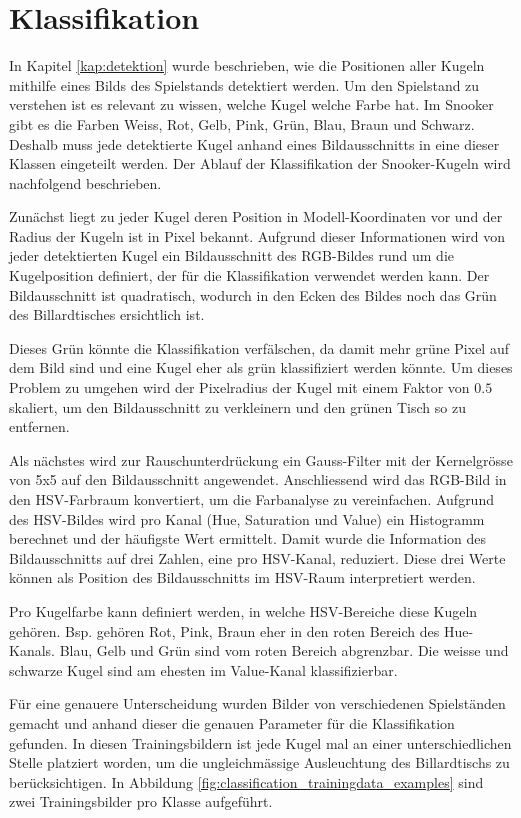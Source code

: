 \newpage
\section{Klassifikation}\label{kap:klassifikation}
In Kapitel \ref{kap:detektion} wurde beschrieben, wie die Positionen aller Kugeln mithilfe eines Bilds des Spielstands detektiert werden.
Um den Spielstand zu verstehen ist es relevant zu wissen, welche Kugel welche Farbe hat.
Im Snooker gibt es die Farben Weiss, Rot, Gelb, Pink, Grün, Blau, Braun und Schwarz.
Deshalb muss jede detektierte Kugel anhand eines Bildausschnitts in eine dieser Klassen eingeteilt werden.
Der Ablauf der Klassifikation der Snooker-Kugeln wird nachfolgend beschrieben.

Zunächst liegt zu jeder Kugel deren Position in Modell-Koordinaten vor und der Radius der Kugeln ist in Pixel bekannt\cite{project2:pixel_to_model_coordinates}.
Aufgrund dieser Informationen wird von jeder detektierten Kugel ein Bildausschnitt des RGB-Bildes rund um die Kugelposition definiert,
der für die Klassifikation verwendet werden kann.
Der Bildausschnitt ist quadratisch, wodurch in den Ecken des Bildes noch das Grün des Billardtisches ersichtlich ist.

Dieses Grün könnte die Klassifikation verfälschen, da damit mehr grüne Pixel auf dem Bild sind und eine Kugel eher als grün klassifiziert werden könnte.
Um dieses Problem zu umgehen wird der Pixelradius der Kugel mit einem Faktor von $0.5$ skaliert, um den Bildausschnitt zu verkleinern
und den grünen Tisch so zu entfernen.

Als nächstes wird zur Rauschunterdrückung ein Gauss-Filter mit der Kernelgrösse von 5x5 auf den Bildausschnitt angewendet.
Anschliessend wird das RGB-Bild in den HSV-Farbraum\cite{wiki:hsv_color_space} konvertiert, um die Farbanalyse zu vereinfachen.
Aufgrund des HSV-Bildes wird pro Kanal (Hue, Saturation und Value) ein Histogramm berechnet und der häufigste Wert ermittelt.
Damit wurde die Information des Bildausschnitts auf drei Zahlen, eine pro HSV-Kanal, reduziert.
Diese drei Werte können als Position des Bildausschnitts im HSV-Raum interpretiert werden.

Pro Kugelfarbe kann definiert werden, in welche HSV-Bereiche diese Kugeln gehören. Bsp. gehören Rot, Pink, Braun eher in den roten
Bereich des Hue-Kanals. Blau, Gelb und Grün sind vom roten Bereich abgrenzbar.
Die weisse und schwarze Kugel sind am ehesten im Value-Kanal klassifizierbar.

Für eine genauere Unterscheidung wurden Bilder von verschiedenen Spielständen gemacht und anhand dieser die genauen Parameter
für die Klassifikation gefunden. In diesen Trainingsbildern ist jede Kugel mal an einer unterschiedlichen Stelle platziert worden,
um die ungleichmässige Ausleuchtung des Billardtischs zu berücksichtigen.
In Abbildung \ref{fig:classification_trainingdata_examples} sind zwei Trainingsbilder pro Klasse aufgeführt.

